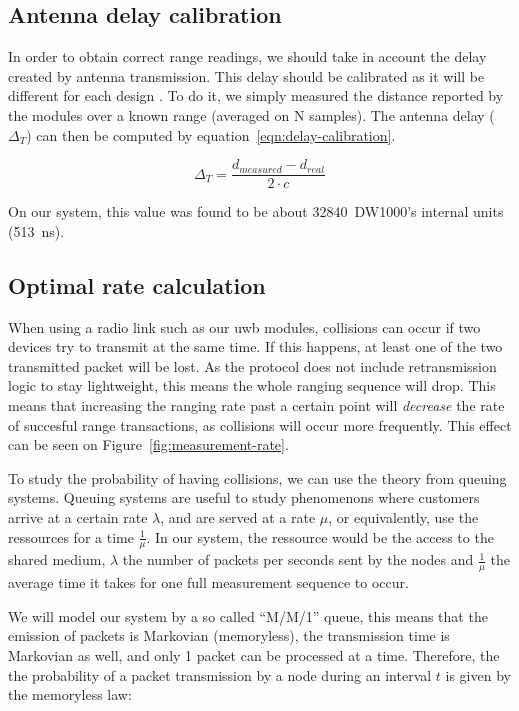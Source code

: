 \documentclass[a4paper, 12pt]{scrreprt}
\begin{document}
\subsection{Antenna delay calibration}
In order to obtain correct range readings, we should take in account the delay created by antenna transmission.
This delay should be calibrated as it will be different for each design \cite{dw1000manual}.
To do it, we simply measured the distance reported by the modules over a known range (averaged on N samples).
The antenna delay ($\Delta_T$) can then be computed by equation~\ref{eqn:delay-calibration}.

\begin{equation}
    \Delta_T = \frac{d_{measured} - d_{real}}{2\cdot c}
    \label{eqn:delay-calibration}
\end{equation}

On our system, this value was found to be about 32840~DW1000's internal units (\SI{513}{\nano\second}).


\subsection{Optimal rate calculation}
\label{sec:optimal-rate}
When using a radio link such as our \gls{uwb} modules, collisions can occur if two devices try to transmit at the same time.
If this happens, at least one of the two transmitted packet will be lost.
As the protocol does not include retransmission logic to stay lightweight, this means the whole ranging sequence will drop.
This means that increasing the ranging rate past a certain point will \emph{decrease} the rate of succesful range transactions, as collisions will occur more frequently.
This effect can be seen on Figure~\ref{fig:measurement-rate}.

To study the probability of having collisions, we can use the theory from queuing systems\cite{hongler2017stochastic}.
Queuing systems are useful to study phenomenons where customers arrive at a certain rate $\lambda$, and are served at a rate $\mu$, or equivalently, use the ressources for a time $\frac{1}{\mu}$.
In our system, the ressource would be the access to the shared medium, $\lambda$ the number of packets per seconds sent by the nodes and $\frac{1}{\mu}$ the average time it takes for one full measurement sequence to occur.

We will model our system by a so called ``M/M/1'' queue, this means that the emission of packets is Markovian (memoryless), the transmission time is Markovian as well, and only 1 packet can be processed at a time.
Therefore, the the probability of a packet transmission by a node during an interval $t$ is given by the memoryless law:
\end{document}
